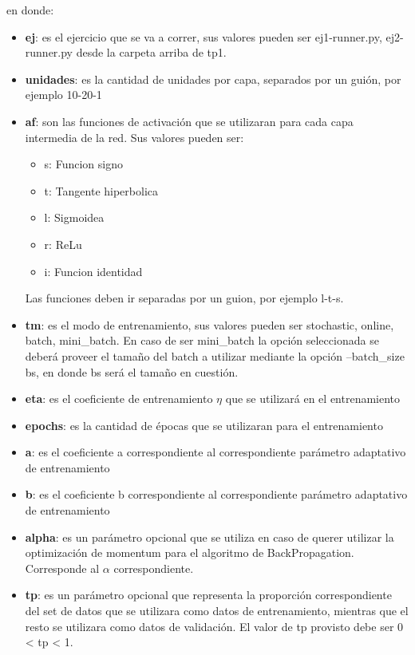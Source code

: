 en donde:
\begin{itemize}
  \item \textbf{ej}: es el ejercicio que se va a correr, sus valores pueden ser {ej1-runner.py, ej2-runner.py} desde la carpeta arriba de tp1.
  \item \textbf{unidades}: es la cantidad de unidades por capa, separados por un guión, por ejemplo 10-20-1
  \item \textbf{af}: son las funciones de activación que se utilizaran para cada capa intermedia de la red. Sus valores pueden ser:
	  \begin{itemize} 
	      \item s: Funcion signo
	      \item t: Tangente hiperbolica
          \item l: Sigmoidea
          \item r: ReLu
          \item i: Funcion identidad
       \end{itemize}
	   Las funciones deben ir separadas por un guion, por ejemplo l-t-s.
  \item \textbf{tm}: es el modo de entrenamiento, sus valores pueden ser {stochastic, online, batch, mini\_batch}. En caso de ser mini\_batch la opción seleccionada se deberá
            proveer el tamaño del batch a utilizar mediante la opción --batch\_size bs, en donde bs será el tamaño en cuestión.
  \item \textbf{eta}: es el coeficiente de entrenamiento $\eta$ que se utilizará en el entrenamiento
  \item \textbf{epochs}: es la cantidad de épocas que se utilizaran para el entrenamiento
  \item \textbf{a}: es el coeficiente a correspondiente al correspondiente parámetro adaptativo de entrenamiento
  \item \textbf{b}: es el coeficiente b correspondiente al correspondiente parámetro adaptativo de entrenamiento
  \item \textbf{alpha}: es un parámetro opcional que se utiliza en caso de querer utilizar la optimización de momentum para el algoritmo de BackPropagation. Corresponde al $\alpha$
                correspondiente.
  \item \textbf{tp}: es un parámetro opcional que representa la proporción correspondiente del set de datos que se utilizara como datos de entrenamiento,
            mientras que el resto se utilizara como datos de validación. El valor de tp provisto debe ser 0 < tp < 1.

\end{itemize}
